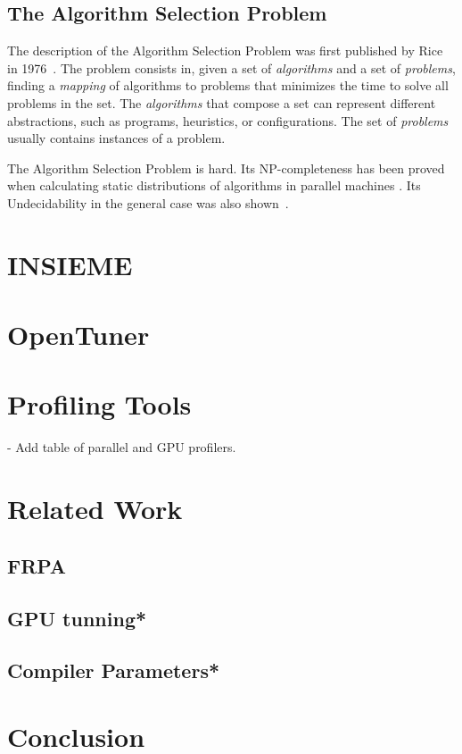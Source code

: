 \documentclass[a4paper, 12pt]{article}
\begin{document}
\subsection{The Algorithm Selection Problem}

The description of the Algorithm Selection Problem was first published by Rice
in 1976~\cite{rice1976algorithm}. The problem consists in, given a set of
\emph{algorithms} and a set of \emph{problems}, finding a \emph{mapping} of
algorithms to problems that minimizes the time to solve all problems in the
set. The \emph{algorithms} that compose a set can represent different
abstractions, such as programs, heuristics, or configurations. The set of
\emph{problems} usually contains instances of a problem.

The Algorithm Selection Problem is hard. Its NP-completeness has been proved
when calculating static distributions of algorithms in parallel machines
\cite{bougeret2009combining}. Its Undecidability in the general case was also
shown~\cite{guo2003algorithm}.

\section{INSIEME} \label{sec:insieme}

\section{OpenTuner} \label{sec:opentuner}

\section{Profiling Tools} \label{sec:profilers}

- Add table of parallel and GPU profilers.


\section{Related Work} \label{sec:related}

\subsection{FRPA}

\subsection{GPU tunning*}

\subsection{Compiler Parameters*}

\section{Conclusion} \label{sec:conclusion}

 

\end{document}
